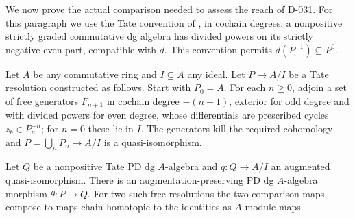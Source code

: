 We now prove the actual comparison needed to assess the reach of D-031.
For this paragraph we use the Tate convention of
\cite[Definitions 23.6.1 and 23.6.5]{B_StacksTate}, in cochain degrees:
a nonpositive strictly graded commutative dg algebra has divided powers
on its strictly negative even part, compatible with $d$.
This convention permits $d(P^{-1})\subseteq P^0$.

\begin{theorem}
\label{B006}
Let $A$ be any commutative ring and $I\subseteq A$ any ideal.
Let $P\to A/I$ be a Tate resolution constructed as follows.
Start with $P_0=A$.  For each $n\geq0$, adjoin a set of free generators
$F_{n+1}$ in cochain degree $-(n+1)$, exterior for odd degree and with
divided powers for even degree, whose differentials are prescribed
cycles $z_b\in P_n^{-n}$; for $n=0$ these lie in $I$.
The generators kill the required cohomology and
$P=\bigcup_nP_n\to A/I$ is a quasi-isomorphism.

Let $Q$ be a nonpositive Tate PD dg $A$-algebra and
$q:Q\to A/I$ an augmented quasi-isomorphism.
There is an augmentation-preserving PD dg $A$-algebra morphism
$\theta:P\to Q$.  For two such free resolutions the two comparison
maps compose to maps chain homotopic to the identities as $A$-module
maps.
\end{theorem}

